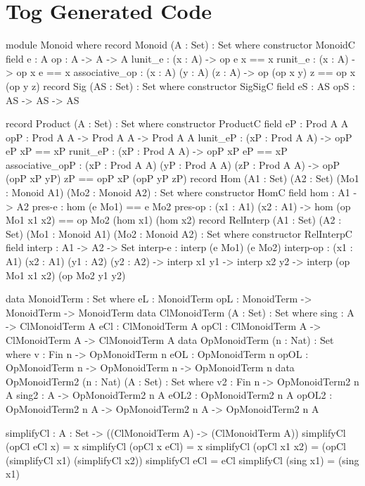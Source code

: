 \chapter{Tog Generated Code}
\label{appendix:generatedTog}
\begin{togcode} 
module Monoid  where
  record Monoid (A : Set) : Set where
   constructor MonoidC
   field
     e : A
     op : A -> A -> A
     lunit_e : (x : A) -> op e x == x
     runit_e : (x : A) -> op x e == x
     associative_op : (x : A) (y : A) (z : A) -> 
                      op (op x y) z == op x (op y z)
  record Sig (AS : Set) : Set where
   constructor SigSigC
   field
     eS : AS
     opS : AS -> AS -> AS
\end{togcode} 
\begin{togcode}      
  record Product (A : Set) : Set where
   constructor ProductC
   field
     eP : Prod A A
     opP : Prod A A -> Prod A A -> Prod A A
     lunit_eP : (xP : Prod A A) -> opP eP xP == xP
     runit_eP : (xP : Prod A A) -> opP xP eP == xP
     associative_opP : (xP : Prod A A) (yP : Prod A A) (zP : Prod A A) -> 
                       opP (opP xP yP) zP == opP xP (opP yP zP)
  record Hom (A1 : Set) (A2 : Set) 
             (Mo1 : Monoid A1) (Mo2 : Monoid A2) : Set where
   constructor HomC
   field
     hom : A1 -> A2
     pres-e : hom (e Mo1) == e Mo2
     pres-op : (x1 : A1) (x2 : A1) -> 
               hom (op Mo1 x1 x2) == op Mo2 (hom x1) (hom x2)
  record RelInterp (A1 : Set) (A2 : Set) 
              (Mo1 : Monoid A1) (Mo2 : Monoid A2) : Set where
   constructor RelInterpC
   field
     interp : A1 -> A2 -> Set
     interp-e : interp (e Mo1) (e Mo2)
     interp-op : (x1 : A1) (x2 : A1) (y1 : A2) (y2 : A2) -> 
                    interp x1 y1 -> interp x2 y2 -> 
                    interp (op Mo1 x1 x2) (op Mo2 y1 y2)
\end{togcode} 
\begin{togcode}                     
  data MonoidTerm : Set where
    eL : MonoidTerm
    opL : MonoidTerm -> MonoidTerm -> MonoidTerm
  data ClMonoidTerm (A : Set) : Set where
    sing : A -> ClMonoidTerm A
    eCl : ClMonoidTerm A
    opCl : ClMonoidTerm A -> ClMonoidTerm A -> ClMonoidTerm A
  data OpMonoidTerm (n : Nat) : Set where
    v : Fin n -> OpMonoidTerm n
    eOL : OpMonoidTerm n
    opOL : OpMonoidTerm n -> OpMonoidTerm n -> OpMonoidTerm n
  data OpMonoidTerm2 (n : Nat) (A : Set) : Set where
    v2 : Fin n -> OpMonoidTerm2 n A
    sing2 : A -> OpMonoidTerm2 n A
    eOL2 : OpMonoidTerm2 n A
    opOL2 : OpMonoidTerm2 n A -> OpMonoidTerm2 n A -> OpMonoidTerm2 n A
 
  simplifyCl : {A : Set} -> ((ClMonoidTerm A) -> (ClMonoidTerm A))
  simplifyCl (opCl eCl x) = x 
  simplifyCl (opCl x eCl) = x 
  simplifyCl (opCl x1 x2) = (opCl (simplifyCl x1) (simplifyCl x2)) 
  simplifyCl eCl = eCl 
  simplifyCl (sing x1) = (sing x1) 
  
\end{togcode} 
